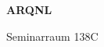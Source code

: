 \documentclass[a4paper]{article}
\begin{document}
\printGenericVSLHeader
\begin{center}
\begin{vsltext}{3cm}{4cm}

   \vspace{0.5cm} 

    \textbf{ARQNL} 

    \vspace{1.5cm}

    Seminarraum 138C

\end{vsltext}

\end{center}
\end{document}
